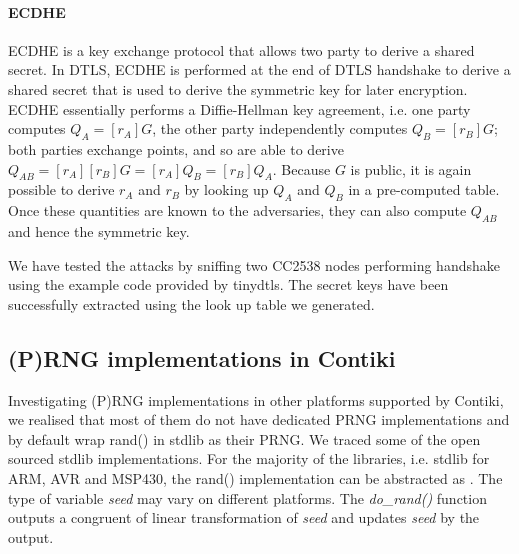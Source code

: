 \paragraph{\textbf{ECDHE}}
	ECDHE\cite{rfc4492} is a key exchange protocol that allows two party to derive a shared secret. In DTLS, ECDHE is performed at the end of DTLS handshake to derive a shared secret that is used to derive the symmetric key for later encryption. ECDHE essentially performs a Diffie-Hellman key agreement, i.e. one party computes $Q_A = [r_A]G$, the other party independently computes $Q_B = [r_B]G$; both parties exchange points, and so are able to derive  $Q_{AB} = [r_A][r_B]G = [r_A]{Q_B} = [r_B]{Q_A}$. Because $G$ is public, it is again possible to derive $r_A$ and $r_B$ by looking up $Q_A$ and $Q_B$  in a pre-computed table. Once these quantities are known to the adversaries, they can also compute $Q_{AB}$ and hence the symmetric key.


We have tested the attacks by sniffing two CC2538 nodes performing handshake using the example code provided by tinydtls. The secret keys have been successfully extracted using the look up table we generated.

\subsection{(P)RNG implementations in Contiki}\label{PRNGReflection}
Investigating (P)RNG implementations in other platforms supported by Contiki, we realised that most of them do not have dedicated PRNG implementations and by default wrap rand() in stdlib as their PRNG. We traced some of the open sourced stdlib implementations. For the majority of the libraries, i.e. stdlib for ARM\cite{ARMrand}, AVR\cite{AVRrand} and MSP430\cite{MSP430rand}, the rand() implementation can be abstracted as . The type of variable \textit{seed}  may vary on different platforms. The \textit{do\_rand()} function outputs a congruent of linear transformation of \textit{seed} and updates \textit{seed} by the output.
 

